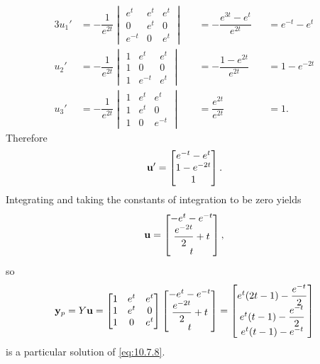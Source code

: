 \begin{alistSolution}
\begin{alignat*}{3}
u_1'
&=-\dfrac{1}{e^{2t}}
\begin{vmatrix}e^t&e^t&e^t\\0&e^t&0\\e^{-t}&0&e^t\end{vmatrix}
&&=-\dfrac{e^{3t}-e^t}{e^{2t}}
&&=e^{-t}-e^t\\
u_2'
&=-\dfrac{1}{e^{2t}}
\begin{vmatrix}1&e^t&e^t\\1&0&0\\1&e^{-t}&e^t\end{vmatrix}
&&=-\dfrac{1-e^{2t}}{e^{2t}}
&&=1-e^{-2t}\\
u_3'
&=-\dfrac{1}{e^{2t}}
\begin{vmatrix}1&e^t&e^t\\1&e^t&0\\1&0&e^{-t}\end{vmatrix}
&&=\dfrac{e^{2t}}{e^{2t}}
&&=1.
\end{alignat*}
 Therefore
\[
\mathbf{u}'=\begin{bmatrix}e^{-t}-e^t\\1-e^{-2t}\\1\end{bmatrix}.
\]
Integrating and taking the constants of integration to be zero yields
\[
\mathbf{u}=\begin{bmatrix}-e^t-e^{-t}\\\dfrac{e^{-2t}}{2}+t\\t\end{bmatrix},
\]
so
\[
\mathbf{y}_p=Y\mathbf{u}=
\begin{bmatrix}1&e^t&e^t\\1&e^t&0\\1&0&e^t\end{bmatrix}
\begin{bmatrix}-e^t-e^{-t}\\\dfrac{e^{-2t}}{2}+t\\t\end{bmatrix}
=\begin{bmatrix}
e^t(2t-1)-\dfrac{e^{-t}}{2}\\e^t(t-1)-\dfrac{e^{-t}}{2}\\e^t(t-1)-e^{-t}
\end{bmatrix}
\]
is a particular solution of  \eqref{eq:10.7.8}.


\end{alistSolution}
